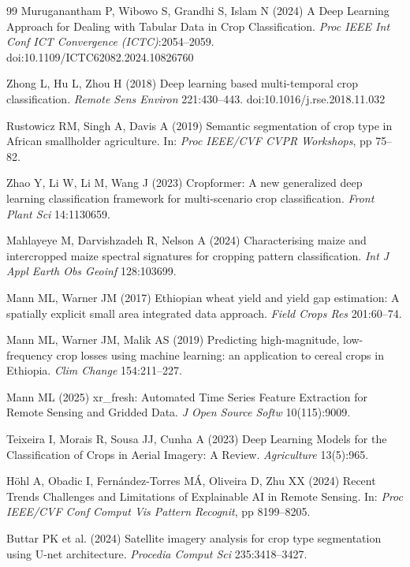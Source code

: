 \documentclass[pdflatex,sn-mathphys]{sn-jnl} %
\begin{document}
\begin{thebibliography}{99}
Muruganantham P, Wibowo S, Grandhi S, Islam N (2024) A Deep Learning Approach for Dealing with Tabular Data in Crop Classification. \textit{Proc IEEE Int Conf ICT Convergence (ICTC)}:2054--2059. doi:10.1109/ICTC62082.2024.10826760

Zhong L, Hu L, Zhou H (2018) Deep learning based multi-temporal crop classification. \textit{Remote Sens Environ} 221:430--443. doi:10.1016/j.rse.2018.11.032

Rustowicz RM, Singh A, Davis A (2019) Semantic segmentation of crop type in African smallholder agriculture. In: \textit{Proc IEEE/CVF CVPR Workshops}, pp 75--82.


Zhao Y, Li W, Li M, Wang J (2023) Cropformer: A new generalized deep learning classification framework for multi-scenario crop classification. \textit{Front Plant Sci} 14:1130659.


Mahlayeye M, Darvishzadeh R, Nelson A (2024) Characterising maize and intercropped maize spectral signatures for cropping pattern classification. \textit{Int J Appl Earth Obs Geoinf} 128:103699.


Mann ML, Warner JM (2017) Ethiopian wheat yield and yield gap estimation: A spatially explicit small area integrated data approach. \textit{Field Crops Res} 201:60--74.

Mann ML, Warner JM, Malik AS (2019) Predicting high-magnitude, low-frequency crop losses using machine learning: an application to cereal crops in Ethiopia. \textit{Clim Change} 154:211--227.

Mann ML (2025) xr\_fresh: Automated Time Series Feature Extraction for Remote Sensing and Gridded Data. \textit{J Open Source Softw} 10(115):9009.

Teixeira I, Morais R, Sousa JJ, Cunha A (2023) Deep Learning Models for the Classification of Crops in Aerial Imagery: A Review. \textit{Agriculture} 13(5):965.

Höhl A, Obadic I, Fernández-Torres MÁ, Oliveira D, Zhu XX (2024) Recent Trends Challenges and Limitations of Explainable AI in Remote Sensing. In: \textit{Proc IEEE/CVF Conf Comput Vis Pattern Recognit}, pp 8199--8205.

Buttar PK et al. (2024) Satellite imagery analysis for crop type segmentation using U-net architecture. \textit{Procedia Comput Sci} 235:3418--3427.


\end{thebibliography}
\end{document}
